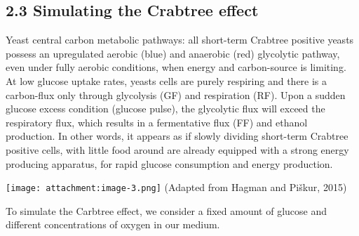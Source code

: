 \documentclass[11pt]{article}
\begin{document}
    \hypertarget{simulating-the-crabtree-effect}{%
\subsection{2.3 Simulating the Crabtree
effect}\label{simulating-the-crabtree-effect}}

    Yeast central carbon metabolic pathways: all short-term Crabtree
positive yeasts possess an upregulated aerobic (blue) and anaerobic
(red) glycolytic pathway, even under fully aerobic conditions, when
energy and carbon-source is limiting. At low glucose uptake rates,
yeasts cells are purely respiring and there is a carbon-flux only
through glycolysis (GF) and respiration (RF). Upon a sudden glucose
excess condition (glucose pulse), the glycolytic flux will exceed the
respiratory flux, which results in a fermentative flux (FF) and ethanol
production. In other words, it appears as if slowly dividing short-term
Crabtree positive cells, with little food around are already equipped
with a strong energy producing apparatus, for rapid glucose consumption
and energy production.

\texttt{[image: attachment:image-3.png]} (Adapted from Hagman and
Piškur, 2015)

    To simulate the Carbtree effect, we consider a fixed amount of glucose
and different concentrations of oxygen in our medium.
\end{document}

